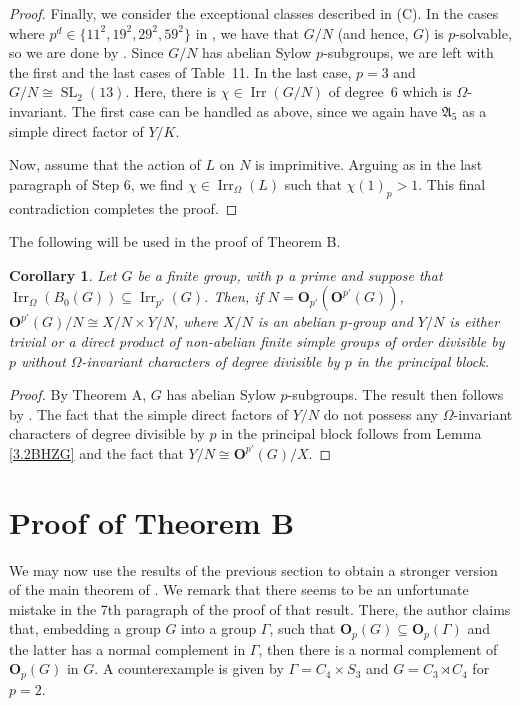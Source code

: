 \documentclass[12pt]{amsart}
\theoremstyle{theorem}
\newtheorem{cor}[teo]{Corollary}
\theoremstyle{definition}
\newcommand{\fA} {\mathfrak A}
\newcommand{\bO}{{\mathbf O}}
\newcommand{\Irr}{{\operatorname{Irr}}}
\newcommand{\SL}{\operatorname{SL}}
\begin{document}
\begin{proof}
		Finally, we consider the exceptional classes described in (C). In the cases
		where $p^d\in\{11^2,19^2,29^2,59^2\}$ in \cite[Table~11]{liebeck}, we have that
		$G/N$ (and hence, $G$) is $p$-solvable, so we are done by \cite[Theorem 3]{MMRSF}. Since $G/N$ has abelian
		Sylow $p$-subgroups, we are left with the first and the last cases of Table~11.
		In the last case, $p=3$ and $G/N\cong\SL_2(13)$. Here, there is
		$\chi\in\Irr(G/N)$ of degree~6 which is $\Omega$-invariant. The first case can be handled as above, since we again have $\fA_5$ as a simple direct factor of $Y/K$.
		\medskip
		
		Now, assume that the action of $L$ on $N$ is imprimitive. Arguing as in the
		last paragraph of Step 6, we find $\chi\in\Irr_\Omega(L)$ such that $\chi(1)_p>1$. This final contradiction completes the proof.
		
	\end{proof}
	
The following will be used in the proof of Theorem B. 	
	
	\begin{cor}
		\label{GritV1}
		Let $G$ be a finite group, with $p$ a prime and suppose that $\Irr_{\Omega}(B_0(G)) \subseteq \Irr_{p'}(G)$. Then, if $N = \bO_{p'}(\bO^{p'}(G))$, $\bO^{p'}(G)/N \cong X/N \times Y/N$, where $X/N$ is an abelian $p$-group and $Y/N$ is either trivial or a direct product of non-abelian finite simple groups of order divisible by $p$ without $\Omega$-invariant characters of degree divisible by $p$ in the principal block.
	\end{cor}
	
	\begin{proof}
		By Theorem A, $G$ has abelian Sylow $p$-subgroups. The result then follows by \cite[Theorem 4.1]{MinimalHeights}. The fact that the simple direct factors of $Y/N$ do not possess any $\Omega$-invariant characters of degree divisible by $p$ in the principal block follows from Lemma \ref{3.2BHZG} and the fact that $Y/N \cong \bO^{p'}(G)/X$.
	\end{proof}
	
	\medskip
	
	\section{Proof of Theorem B}
	
	We may now use the results of the previous section to obtain a stronger version of the main theorem of \cite{Grit}. We remark that there seems to be an unfortunate mistake in the 7th paragraph of the proof of that result. There, the author claims that, embedding a group $G$ into a group $\Gamma$, such that $\bO_p(G) \subseteq \bO_p(\Gamma)$ and the latter has a normal complement in $\Gamma$, then there is a normal complement of $\bO_p(G)$ in $G$. A counterexample is given by $\Gamma = C_4 \times S_3$ and $G = C_3 \rtimes C_4$ for $p = 2$.
	
\end{document}
